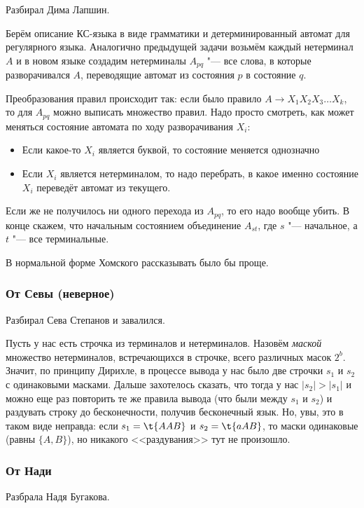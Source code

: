 	Разбирал Дима Лапшин.

	Берём описание КС-языка в виде грамматики и детерминированный автомат для регулярного языка.
	Аналогично предыдущей задачи возьмём каждый нетерминал $A$ и в новом языке создадим
	нетерминалы $A_{pq}$ "--- все слова, в которые разворачивался $A$, переводящие автомат
	из состояния $p$ в состояние $q$.

	Преобразования правил происходит так: если было правило $A \to X_1X_2X_3\dots X_k$, то для $A_{pq}$ можно выписать множество правил.
	Надо просто смотреть, как может меняться состояние автомата по ходу разворачивания $X_i$:
	\begin{itemize}
		\item
			Если какое-то $X_i$ является буквой, то состояние меняется однозначно
		\item
			Если $X_i$ является нетерминалом, то надо перебрать, в какое именно состояние $X_i$ переведёт автомат из текущего.
	\end{itemize}
	Если же не получилось ни одного перехода из $A_{pq}$, то его надо вообще убить.
	В конце скажем, что начальным состоянием объединение $A_{st}$, где $s$ "--- начальное, а $t$ "--- все терминальные.

	\begin{Rem}
		В нормальной форме Хомского рассказывать было бы проще.
	\end{Rem}

	\subsubsection{От Севы (неверное)}
		Разбирал Сева Степанов и завалился.

		Пусть у нас есть строчка из терминалов и нетерминалов.
		Назовём \textit{маской} множество нетерминалов, встречающихся в строчке,
		всего различных масок $2^b$.
		Значит, по принципу Дирихле, в процессе вывода у нас было две строчки $s_1$ и $s_2$ с одинаковыми масками.
		Дальше захотелось сказать, что тогда у нас $|s_2|>|s_1|$ и можно еще раз повторить
		те же правила вывода (что были между $s_1$ и $s_2$) и раздувать строку до бесконечности, получив бесконечный язык.
		Но, увы, это в таком виде неправда: если $s_1=\t{AAB}$ и $s_2=\t{aAB}$, то маски одинаковые (равны $\{A, B\}$),
		но никакого <<раздувания>> тут не произошло.

	\subsubsection{От Нади}
		Разбрала Надя Бугакова.

